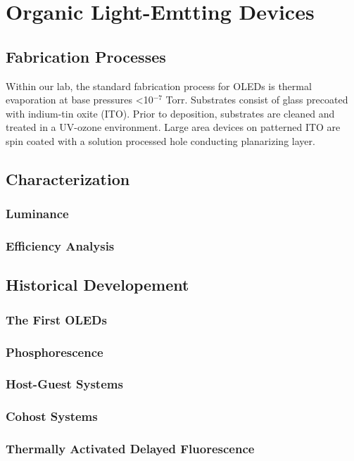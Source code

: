 \documentclass[../thesis.tex]{subfiles}
\begin{document}
\chapter{Organic Light-Emtting Devices}\label{sec:oleds}

\section{Fabrication Processes}

Within our lab, the standard fabrication process for OLEDs is thermal evaporation at base pressures <10$^{-7}$ Torr.  Substrates consist of glass precoated with indium-tin oxite (ITO).  Prior to deposition, substrates are cleaned and treated in a UV-ozone environment.  Large area devices on patterned ITO are spin coated with a solution processed hole conducting planarizing layer.

\section{Characterization}
\subsection{Luminance}
\subsection{Efficiency Analysis}\label{sec:efficiency_analysis}

\section{Historical Developement}
\subsection{The First OLEDs}
\subsection{Phosphorescence}
\subsection{Host-Guest Systems}
\subsection{Cohost Systems}
\subsection{Thermally Activated Delayed Fluorescence}
\end{document}
